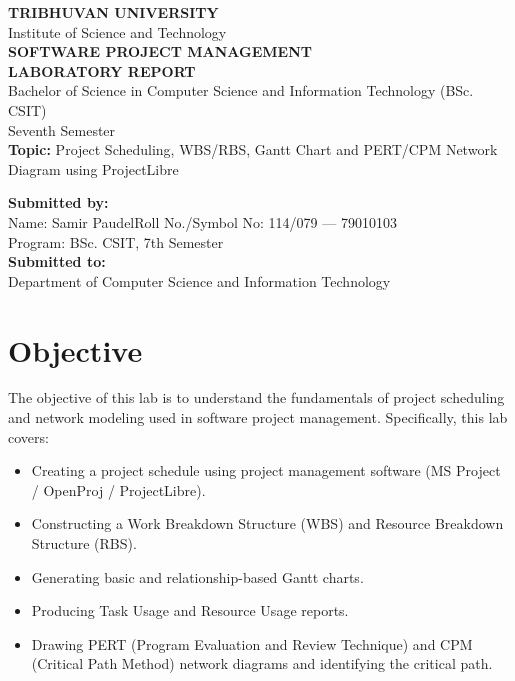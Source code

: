 \documentclass[10pt,a4paper]{article}
\begin{document}
\begin{center}
{\large\textbf{TRIBHUVAN UNIVERSITY}}\\
Institute of Science and Technology\\
\vspace{0.2cm}
{\Large\textbf{SOFTWARE PROJECT MANAGEMENT}}\\
{\large\textbf{LABORATORY REPORT}}\\
Bachelor of Science in Computer Science and Information Technology (BSc. CSIT)\\
Seventh Semester\\
\vspace{0.2cm}
\textbf{Topic:} Project Scheduling, WBS/RBS, Gantt Chart and PERT/CPM Network Diagram using ProjectLibre
\end{center}

\vspace{0.2cm}
\noindent\textbf{Submitted by:}\\
Name: Samir Paudel\hfill Roll No./Symbol No: 114/079 --- 79010103\\
Program: BSc. CSIT, 7th Semester\\[0.1cm]
\textbf{Submitted to:}\\
Department of Computer Science and Information Technology

\hrulefill

\section*{Objective}

The objective of this lab is to understand the fundamentals of project scheduling and network modeling used in software project management. Specifically, this lab covers:
\begin{itemize}[nosep]
    \item Creating a project schedule using project management software (MS Project / OpenProj / ProjectLibre).
    \item Constructing a Work Breakdown Structure (WBS) and Resource Breakdown Structure (RBS).
    \item Generating basic and relationship-based Gantt charts.
    \item Producing Task Usage and Resource Usage reports.
    \item Drawing PERT (Program Evaluation and Review Technique) and CPM (Critical Path Method) network diagrams and identifying the critical path.
\end{itemize}
\end{document}
